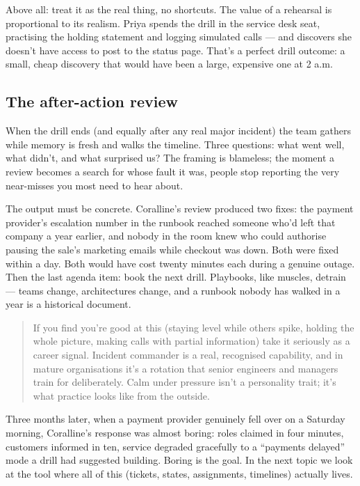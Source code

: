 Above all: treat it as the real thing, no shortcuts. The value of a rehearsal is proportional to its realism. Priya spends the drill in the service desk seat, practising the holding statement and logging simulated calls — and discovers she doesn't have access to post to the status page. That's a perfect drill outcome: a small, cheap discovery that would have been a large, expensive one at 2 a.m.



\subsection{The after-action review}


When the drill ends (and equally after any real major incident) the team gathers while memory is fresh and walks the timeline. Three questions: what went well, what didn't, and what surprised us? The framing is blameless; the moment a review becomes a search for whose fault it was, people stop reporting the very near-misses you most need to hear about.


The output must be concrete. Coralline's review produced two fixes: the payment provider's escalation number in the runbook reached someone who'd left that company a year earlier, and nobody in the room knew who could authorise pausing the sale's marketing emails while checkout was down. Both were fixed within a day. Both would have cost twenty minutes each during a genuine outage. Then the last agenda item: book the next drill. Playbooks, like muscles, detrain — teams change, architectures change, and a runbook nobody has walked in a year is a historical document.



\begin{quote}\small
If you find you're good at this (staying level while others spike, holding the whole picture, making calls with partial information) take it seriously as a career signal. Incident commander is a real, recognised capability, and in mature organisations it's a rotation that senior engineers and managers train for deliberately. Calm under pressure isn't a personality trait; it's what practice looks like from the outside.
\end{quote}


Three months later, when a payment provider genuinely fell over on a Saturday morning, Coralline's response was almost boring: roles claimed in four minutes, customers informed in ten, service degraded gracefully to a ``payments delayed'' mode a drill had suggested building. Boring is the goal. In the next topic we look at the tool where all of this (tickets, states, assignments, timelines) actually lives.

